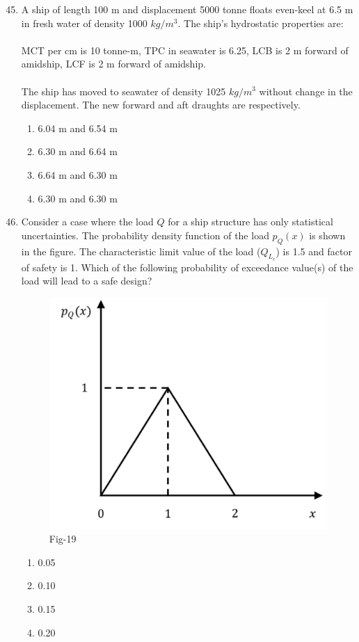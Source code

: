 \documentclass[journal]{IEEEtran}
\theoremstyle{remark}
\begin{document}
\begin{enumerate}[itemsep=1em]
\setcounter{enumi}{44}
\item A ship of length 100 m and displacement 5000 tonne floats even-keel at 6.5 m in fresh water of density 1000 $kg/m^3$. The ship's hydrostatic properties are: \\
\\
MCT per cm is 10 tonne-m, 
TPC in seawater is 6.25,  
LCB is 2 m forward of amidship, 
LCF is 2 m forward of amidship.\\
\\
The ship has moved to seawater of density 1025 $kg/m^3$ without change in the 
displacement. The new forward and aft draughts are \underline{\hspace{1cm}} respectively.
\begin{enumerate}[leftmargin=2.5em, labelsep=0.5em, itemsep=0.5em]
    \item 6.04 m and 6.54 m 
    \item 6.30 m and 6.64 m 
    \item 6.64 m and 6.30 m 
    \item 6.30 m and 6.30 m 
\end{enumerate}
\end{enumerate}

\begin{enumerate}[itemsep=1em]
\setcounter{enumi}{45}
\item Consider a case where the load $Q$ for a ship structure has only statistical uncertainties. The probability density function of the load $p_Q(x)$ is shown in the figure. The characteristic limit value of the load ($Q_{L_c}$) is 1.5 and factor of safety is 1. Which of the following probability of exceedance value(s) of the load will lead to a safe design? 
\begin{figure}[H]
    \centering
    \includegraphics[width=0.3\columnwidth]{figs/fig-19.jpeg}
    \caption*{Fig-19}
    \label{fig:19}
\end{figure}
\newpage
\vspace*{0.25cm}
\begin{multicols}{4}
\begin{enumerate}
    \item 0.05
    \item 0.10
    \item 0.15
    \item 0.20
\end{enumerate}
\end{multicols}
\end{enumerate}
\end{document}
